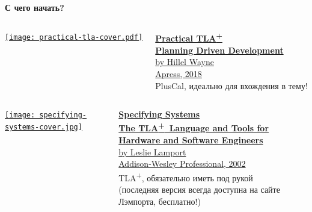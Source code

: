 \documentclass[
  11pt,aspectratio=1610,pdf,hyperref={unicode,colorlinks=false}
]{beamer}
\def\TLA{TLA\textsuperscript{+}}
\begin{document}
\begin{frame}
  \centering\Large\bf{С чего начать?}
\end{frame}

\begin{frame}[c]
  \begin{columns}
    \begin{column}{.45\textwidth}
      \centering
      \href{https://www.apress.com/gp/book/9781484238288}{%
        \texttt{[image: practical-tla-cover.pdf]}
      }
    \end{column}
    \begin{column}{.45\textwidth}
      \href{https://www.apress.com/gp/book/9781484238288}{%
        {\Large\bf Practical \TLA}\\
        {\large\bf Planning Driven Development}\\
        {\normalsize by Hillel Wayne\\Apress, 2018}
      }\\
      \vspace{3ex}
      \large
      PlusCal, идеально для вхождения в тему!
    \end{column}
  \end{columns}
\end{frame}

\begin{frame}[c]
  \begin{columns}
    \begin{column}{.45\textwidth}
      \centering
      \href{https://lamport.azurewebsites.net/tla/book.html\#download}{%
        \texttt{[image: specifying-systems-cover.jpg]}
      }
    \end{column}
    \begin{column}{.45\textwidth}
      \href{https://lamport.azurewebsites.net/tla/book.html\#download}{%
        {\Large\bf Specifying Systems}\\
        {\large\bf The \TLA\ Language and Tools for Hardware and Software Engineers}\\
        {\normalsize by Leslie Lamport\\Addison-Wesley Professional, 2002}
      }\\
      \vspace{3ex}
      \large
      \TLA, обязательно иметь под рукой\\
      \vspace{3ex}
      (последняя версия всегда доступна на сайте Лэмпорта, бесплатно!)
    \end{column}
  \end{columns}
\end{frame}
\end{document}

